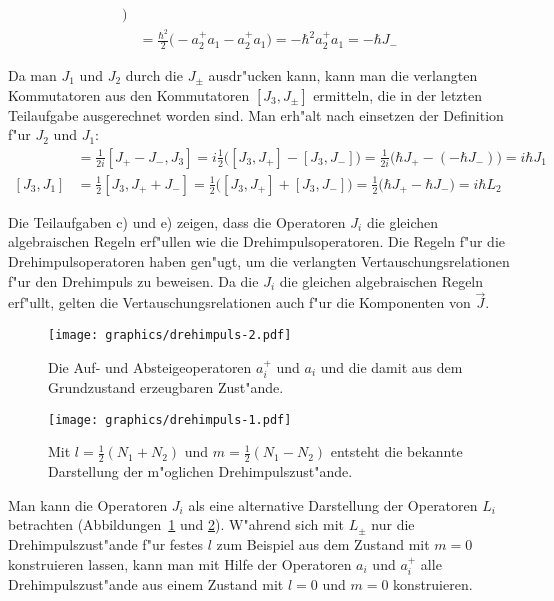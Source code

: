 \begin{loesung}
\begin{teilaufgaben}
\begin{align*}
\bigr)
\\
&=\frac{\hbar^2}{2}
\bigl(
-a_2^+a_1 - a_2^+a_1
\bigr)
=-\hbar^2 a_2^+a_1=-\hbar J_-
\end{align*}
\item 
Da man $J_1$ und $J_2$ durch die $J_\pm$ ausdr"ucken kann, kann man
die verlangten Kommutatoren aus den
Kommutatoren $[J_3,J_\pm]$ ermitteln, die in der letzten Teilaufgabe
ausgerechnet worden sind.
Man erh"alt nach einsetzen der Definition f"ur $J_2$ und $J_1$:
\begin{align*}
[J_2,J_3]
&=
\frac1{2i}[J_+-J_-,J_3]
=
i\frac{1}{2}\bigl([J_3,J_+] - [J_3,J_-]\bigr)
=
\frac1{2i}\bigl(\hbar J_+-(-\hbar J_-)\bigr)
=i\hbar J_1
\\
[J_3,J_1]
&=
\frac{1}{2}[J_3,J_++J_-]
=
\frac{1}{2}\bigl(
[J_3,J_+]
+
[J_3,J_-]
\bigr)
=\frac12\bigl(
\hbar J_+
-
\hbar J_-
\bigr)
=i\hbar L_2
\end{align*}
\item Die Teilaufgaben c) und e) zeigen, dass die Operatoren $J_i$
die gleichen algebraischen Regeln erf"ullen wie die Drehimpulsoperatoren.
Die Regeln f"ur die Drehimpulsoperatoren haben gen"ugt, um die verlangten
Vertauschungsrelationen f"ur den Drehimpuls zu beweisen. Da die $J_i$
die gleichen algebraischen Regeln erf"ullt, gelten die Vertauschungsrelationen
auch f"ur die Komponenten von $\vec J$.
\end{teilaufgaben}
\end{loesung}

\begin{diskussion}
\begin{figure}
\centering
\texttt{[image: graphics/drehimpuls-2.pdf]}
\caption{Die Auf- und Absteigeoperatoren $a_i^+$ und $a_i$ und die
damit aus dem Grundzustand erzeugbaren Zust"ande.
\label{aufgabe12001:operatoren}}
\end{figure}
\begin{figure}
\centering
\texttt{[image: graphics/drehimpuls-1.pdf]}
\caption{Mit $l=\frac12(N_1+N_2)$ und $m=\frac12(N_1-N_2)$ entsteht
die bekannte Darstellung der m"oglichen Drehimpulszust"ande.
\label{aufgabe12001:drehimpuls}}
\end{figure}
Man kann die Operatoren $J_i$ als eine alternative Darstellung der Operatoren
$L_i$ betrachten (Abbildungen~\ref{aufgabe12001:operatoren} und \ref{aufgabe12001:drehimpuls}).
W"ahrend sich mit $L_\pm$ nur die Drehimpulszust"ande f"ur festes
$l$ zum Beispiel aus dem Zustand mit $m=0$ konstruieren lassen,
kann man mit Hilfe der Operatoren $a_i$ und $a_i^+$ alle Drehimpulszust"ande
aus einem Zustand mit $l=0$ und $m=0$ konstruieren.
\end{diskussion}


